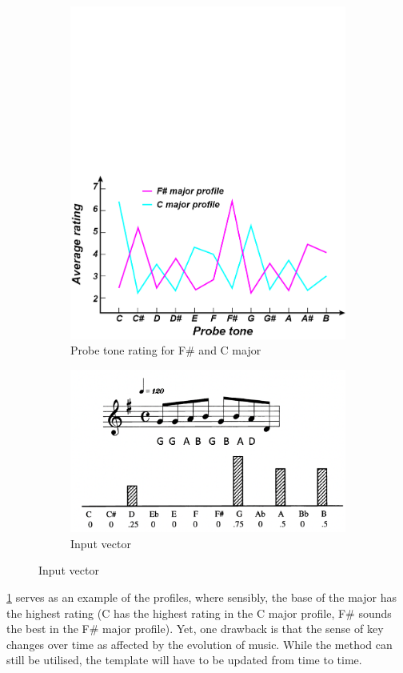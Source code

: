 \begin{figure}[h]
    \centering
    \begin{subfigure}{.45\textwidth}
      \centering
      \includegraphics[width=1\linewidth]{Figures/profiles.png}
      \caption{Probe tone rating for F\# and C major}
      \label{probetone}
    \end{subfigure}%
    \begin{subfigure}{.45\textwidth}
        \centering
        \includegraphics[width=1\linewidth]{Figures/inputvec.png}
        \caption{Input vector}
        \label{inputv}
      \end{subfigure}%
\end{figure}
\cref{probetone} serves as an example of the profiles, where sensibly, the base of the major has the highest rating (C has the highest rating in the C major profile, 
F\# sounds the best in the F\# major profile). 
Yet, one drawback is that the sense of key changes over time as affected by the evolution of music. While the method can still be utilised, the template will have to be
updated from time to time.

